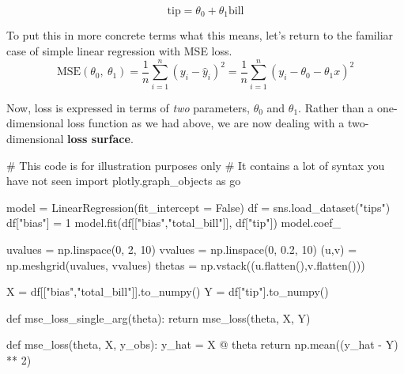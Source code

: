 \documentclass[
  letterpaper,
  DIV=11,
  numbers=noendperiod]{scrreprt}
\newenvironment{Shaded}{\begin{snugshade}}{\end{snugshade}}
\newcommand{\CommentTok}[1]{\textcolor[rgb]{0.37,0.37,0.37}{#1}}
\newcommand{\ControlFlowTok}[1]{\textcolor[rgb]{0.00,0.23,0.31}{#1}}
\newcommand{\DecValTok}[1]{\textcolor[rgb]{0.68,0.00,0.00}{#1}}
\newcommand{\FloatTok}[1]{\textcolor[rgb]{0.68,0.00,0.00}{#1}}
\newcommand{\ImportTok}[1]{\textcolor[rgb]{0.00,0.46,0.62}{#1}}
\newcommand{\KeywordTok}[1]{\textcolor[rgb]{0.00,0.23,0.31}{#1}}
\newcommand{\NormalTok}[1]{\textcolor[rgb]{0.00,0.23,0.31}{#1}}
\newcommand{\OperatorTok}[1]{\textcolor[rgb]{0.37,0.37,0.37}{#1}}
\newcommand{\StringTok}[1]{\textcolor[rgb]{0.13,0.47,0.30}{#1}}
\newcommand{\VariableTok}[1]{\textcolor[rgb]{0.07,0.07,0.07}{#1}}
\begin{document}
\[\textrm{tip} = \theta_0 + \theta_1 \textrm{bill}\]

To put this in more concrete terms what this means, let's return to the
familiar case of simple linear regression with MSE loss.
\[\text{MSE}(\theta_0,\:\theta_1) = \frac{1}{n} \sum_{i=1}^{n} (y_i - \hat{y}_i)^2 = \frac{1}{n} \sum_{i=1}^{n} (y_i - \theta_0 - \theta_1 x)^2\]

Now, loss is expressed in terms of \emph{two} parameters, \(\theta_0\)
and \(\theta_1\). Rather than a one-dimensional loss function as we had
above, we are now dealing with a two-dimensional \textbf{loss surface}.

\begin{Shaded}
\begin{Highlighting}[]
\CommentTok{\# This code is for illustration purposes only}
\CommentTok{\# It contains a lot of syntax you have not seen}
\ImportTok{import}\NormalTok{ plotly.graph\_objects }\ImportTok{as}\NormalTok{ go}

\NormalTok{model }\OperatorTok{=}\NormalTok{ LinearRegression(fit\_intercept }\OperatorTok{=} \VariableTok{False}\NormalTok{)}
\NormalTok{df }\OperatorTok{=}\NormalTok{ sns.load\_dataset(}\StringTok{"tips"}\NormalTok{)}
\NormalTok{df[}\StringTok{"bias"}\NormalTok{] }\OperatorTok{=} \DecValTok{1}
\NormalTok{model.fit(df[[}\StringTok{"bias"}\NormalTok{,}\StringTok{"total\_bill"}\NormalTok{]], df[}\StringTok{"tip"}\NormalTok{])}
\NormalTok{model.coef\_}

\NormalTok{uvalues }\OperatorTok{=}\NormalTok{ np.linspace(}\DecValTok{0}\NormalTok{, }\DecValTok{2}\NormalTok{, }\DecValTok{10}\NormalTok{)}
\NormalTok{vvalues }\OperatorTok{=}\NormalTok{ np.linspace(}\DecValTok{0}\NormalTok{, }\FloatTok{0.2}\NormalTok{, }\DecValTok{10}\NormalTok{)}
\NormalTok{(u,v) }\OperatorTok{=}\NormalTok{ np.meshgrid(uvalues, vvalues)}
\NormalTok{thetas }\OperatorTok{=}\NormalTok{ np.vstack((u.flatten(),v.flatten()))}

\NormalTok{X }\OperatorTok{=}\NormalTok{ df[[}\StringTok{"bias"}\NormalTok{,}\StringTok{"total\_bill"}\NormalTok{]].to\_numpy()}
\NormalTok{Y }\OperatorTok{=}\NormalTok{ df[}\StringTok{"tip"}\NormalTok{].to\_numpy()}

\KeywordTok{def}\NormalTok{ mse\_loss\_single\_arg(theta):}
    \ControlFlowTok{return}\NormalTok{ mse\_loss(theta, X, Y)}

\KeywordTok{def}\NormalTok{ mse\_loss(theta, X, y\_obs):}
\NormalTok{    y\_hat }\OperatorTok{=}\NormalTok{ X }\OperatorTok{@}\NormalTok{ theta}
    \ControlFlowTok{return}\NormalTok{ np.mean((y\_hat }\OperatorTok{{-}}\NormalTok{ Y) }\OperatorTok{**} \DecValTok{2}\NormalTok{)    }


\end{Highlighting}
\end{Shaded}
\end{document}

